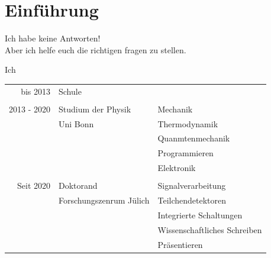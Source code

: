 \section{Einführung}
\begin{frame}{}
\begin{center}
    {\Huge Ich habe keine Antworten!}\\
    Aber ich helfe euch die richtigen fragen zu stellen.

\end{center}
\end{frame}

\begin{frame}{Ich}
    \begin{table}
        \begin{tabularx}{\textwidth}{rll}
            bis 2013 & Schule & \\            
            & & \\
            2013 - 2020 & Studium der Physik & Mechanik\\
            & Uni Bonn & Thermodynamik\\
            & & Quanmtenmechanik\\
            & & Programmieren\\
            & & Elektronik\\
            & & \\
            Seit 2020 & Doktorand & Signalverarbeitung\\
            & Forschungszenrum Jülich & Teilchendetektoren\\
            & & Integrierte Schaltungen\\  
            & & Wissenschaftliches Schreiben \\
            & & Präsentieren \\
        \end{tabularx}
    \end{table}
\end{frame}


